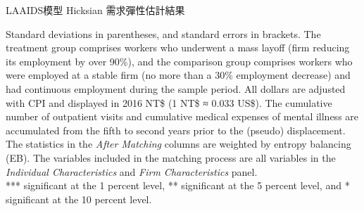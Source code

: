\begin{table}[H]
    \caption{LAAIDS模型 Hicksian 需求彈性估計結果}
    \center
    
\end{table}
\vspace{-2em}
\begin{singlespace}
    \begin{footnotesize}
     Standard deviations in parentheses, and standard errors in brackets. The treatment group comprises workers who underwent a mass layoff (firm reducing its employment by over 90\%), and the comparison group comprises workers who were employed at a stable firm (no more than a 30\% employment decrease) and had continuous employment during the sample period. All dollars are adjusted with CPI and displayed in 2016 NT\$ (1 NT\$ ≈ 0.033 US\$). The cumulative number of outpatient visits and cumulative medical expenses of mental illness are accumulated from the fifth to second years prior to the (pseudo) displacement. The statistics in the {\it After Matching} columns are weighted by entropy balancing (EB). The variables included in the matching process are all variables in the {\it Individual Characteristics} and {\it Firm Characteristics} panel. \\
    *** significant at the 1 percent level, ** significant at the 5 percent level, and * significant at the 10 percent level.
    \end{footnotesize}
\end{singlespace}

% 

